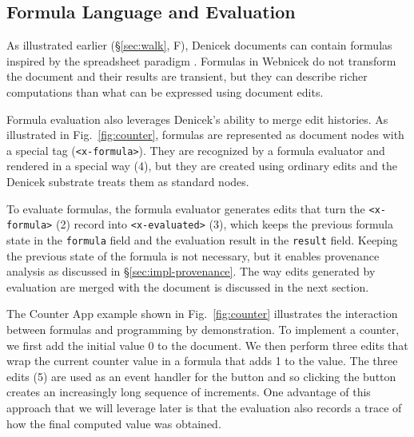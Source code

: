 \documentclass[sigconf,anonymous,screen]{acmart}
\newcommand{\note}[1]{\textcolor{red}{#1}}
\begin{document}

\subsection{Formula Language and Evaluation}
\label{sec:impl-eval}

As illustrated earlier (\S\ref{sec:walk}, F), Denicek documents can contain formulas inspired by the
spreadsheet paradigm \cite{nardi-1990-spreadsheets}. Formulas in Webnicek do not transform the
document and their results are transient, but they can describe richer computations than what can
be expressed using document edits.

Formula evaluation also leverages Denicek's ability to merge edit histories.
As illustrated in Fig.~\ref{fig:counter}, formulas are represented as document nodes with a
special tag ({\small\Verb_<x-formula>_}). They are recognized by a formula evaluator and
rendered in a special way (4), but they are created using ordinary
edits and the Denicek substrate treats them as standard nodes.

To evaluate formulas, the formula evaluator generates edits that turn the {\small\Verb_<x-formula>_} (2)
record into {\small\Verb_<x-evaluated>_} (3), which keeps the previous
formula state in the {\small\Verb_formula_} field and the evaluation result in the {\small\Verb_result_} field.
Keeping the previous state of the formula is not necessary, but it enables provenance analysis
as discussed in \S\ref{sec:impl-provenance}. The way edits generated by evaluation are merged
with the document is discussed in the next section.

%

The Counter App example shown in Fig.~\ref{fig:counter} illustrates the interaction between formulas
and programming by demonstration. To implement a counter, we first add the initial value 0 to the
document. We then perform three edits that wrap the current counter value in a formula that adds
1 to the value. The three edits (5) are used as an event handler for the button and so clicking the
button creates an increasingly long sequence of increments. One advantage of this approach that
we will leverage later is that the evaluation also records a trace of how the final computed value
was obtained.
\end{document}

